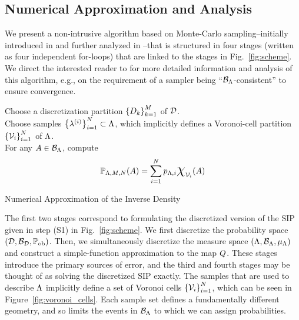 \subsection{Numerical Approximation and Analysis}\label{sec:set-algorithm}
We present a non-intrusive algorithm based on Monte-Carlo sampling\---initially introduced in \cite{BET+14} and further analyzed in \cite{BET+14-arxiv}\---that is structured in four stages (written as four independent for-loops) that are linked to the stages in Fig.~\ref{fig:scheme}.
We direct the interested reader to \cite{BET+14-arxiv} for more detailed information and analysis of this algorithm, e.g., on the requirement of a sampler being ``$\mathcal{B}_{{\Lambda}}$-consistent'' to ensure convergence.


\begin{algorithm}[hbtp]
\DontPrintSemicolon
Choose a discretization partition $\left\{D_k\right\}_{k=1}^{M}$ of $\mathcal{D}$.\\
	Choose samples $\left\{\lambda^{(i)}\right\}_{i=1}^{N} \subset {\Lambda}$, which implicitly defines a Voronoi-cell partition $\left\{\mathcal{V}_i\right\}_{i=1}^{N}$ of ${\Lambda}$.\\
	For any $A\in \mathcal{B}_{{\Lambda}}$, compute
	\begin{equation}
	\PP_{\pspace, \ndiscs, \nsamps} (A) = \sum_{\iparam=1}^\nsamps p_{\pspace, \iparam} \Chi_{\VV_\iparam} (A)
	\end{equation}
 \caption{Numerical Approximation of the Inverse Density}
 \label{alg:inv_density}
\end{algorithm}
\FloatBarrier

The first two stages correspond to formulating the discretized version of the SIP given in step (S1) in Fig.~\ref{fig:scheme}.
We first discretize the probability space $(\mathcal{D}, \mathcal{B}_{\mathcal{D}}, \operatorname*{\mathbb{P}_{ob}})$.
Then, we simultaneously discretize the measure space $({\Lambda}, \mathcal{B}_{{\Lambda}}, \mu_{{\Lambda}})$ and construct a simple-function approximation to the map $Q$.
These stages introduce the primary sources of error, and the third and fourth stages may be thought of as solving the discretized SIP exactly.
The samples that are used to describe ${\Lambda}$ implicitly define a set of Voronoi cells $\left\{\mathcal{V}_i\right\}_{i=1}^{N}$, which can be seen in Figure~\ref{fig:voronoi_cells}.
Each sample set defines a fundamentally different geometry, and so limits the events in $\mathcal{B}_{{\Lambda}}$ to which we can assign probabilities. 

